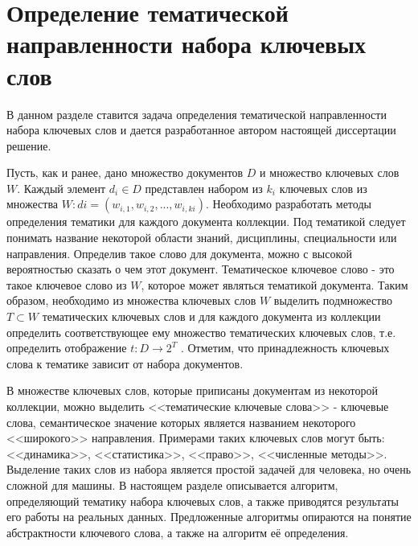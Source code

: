 \section{Определение тематической направленности набора ключевых слов} \label{theme_tags}
В данном разделе ставится задача определения тематической направленности набора ключевых слов и дается разработанное автором настоящей диссертации решение.

Пусть, как и ранее, дано множество документов $D$ и множество ключевых слов $W$. Каждый элемент $d_i \in D$ представлен набором из $k_i$ ключевых слов из множества $W: di = (w_{i,1},w_{i,2},...,w_{i,ki})$. Необходимо разработать методы определения тематики для каждого документа коллекции. Под тематикой следует понимать название некоторой области знаний, дисциплины, специальности или направления. Определив такое слово для документа, можно с высокой вероятностью сказать о чем этот документ. Тематическое ключевое слово - это такое ключевое слово из $W$, которое может являться тематикой документа. Таким образом, необходимо из множества ключевых слов $W$ выделить подмножество $T \subset W$ тематических ключевых слов и для каждого документа из коллекции определить соответствующее ему множество тематических ключевых слов, т.е. определить отображение $t : D \rightarrow 2^T$ . Отметим, что принадлежность ключевых слова к тематике зависит от набора документов.

В множестве ключевых слов, которые приписаны документам из некоторой коллекции, можно выделить <<тематические ключевые слова>> - ключевые слова, семантическое значение которых является названием некоторого <<широкого>> направления. Примерами таких ключевых слов могут быть: <<динамика>>, <<статистика>>, <<право>>, <<численные методы>>. Выделение таких слов из набора является простой задачей для человека, но очень сложной для машины. В настоящем разделе описывается алгоритм, определяющий тематику набора ключевых слов, а также приводятся результаты его работы на реальных данных. Предложенные алгоритмы опираются на понятие абстрактности ключевого слова, а также на алгоритм её определения.


